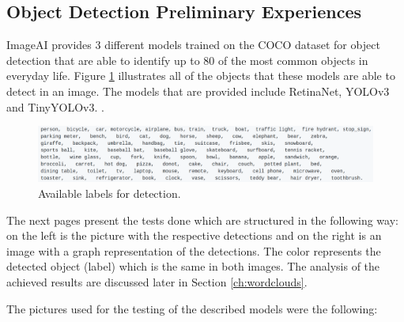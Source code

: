 
  \subsection{Object Detection Preliminary Experiences}
  \label{sec:object_test}

  ImageAI provides 3 different models trained on the COCO dataset for object detection that are able to identify up to 80 of the most common objects in everyday life. Figure \ref{fig:labels} illustrates all of the objects that these models are able to detect in an image. The models that are provided include RetinaNet, YOLOv3 and TinyYOLOv3. \cite{ImageAI}.
  

  

    \begin{figure}[htb]
      \centering
      \includegraphics[width = \textwidth]{Sections/4InitialWork/4_images_random/detections.png}
      \caption{Available labels for detection. }
      \label{fig:labels} 
  \end{figure}

  The next pages present the tests done which are structured in the following way: on the left is the picture with the respective detections and on the right is an image with a graph representation of the detections. The color represents the detected object (label) which is the same in both images. The analysis of the achieved results are discussed later in Section \ref{ch:wordclouds}.

  The pictures used for the testing of the described models were the following:

